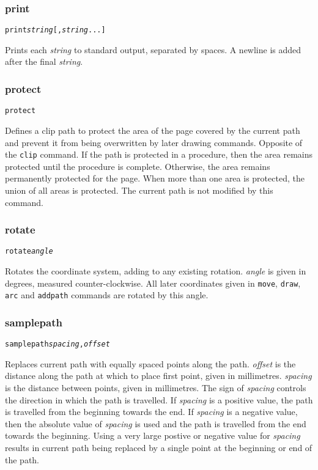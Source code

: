 \subsubsection{print}

\begin{alltt}
print \textit{string} [, \textit{string} ...]
\end{alltt}

Prints each \textit{string} to standard output,
separated by spaces.
A newline is added after the final \textit{string}.

\subsubsection{protect}

\begin{alltt}
protect
\end{alltt}

Defines a clip path to protect the area of the page covered by the current path
and prevent it from being overwritten by later drawing commands.  Opposite of
the \texttt{clip} command.  If the path is protected in a procedure, then the
area remains protected until the procedure is complete.  Otherwise, the area
remains permanently protected for the page.  When more than one area is
protected, the union of all areas is protected.  The current path is not
modified by this command.

\subsubsection{rotate}

\begin{alltt}
rotate \textit{angle}
\end{alltt}

Rotates the coordinate system, adding to any existing rotation.  \textit{angle}
is given in degrees, measured counter-clockwise.  All later coordinates given
in \texttt{move}, \texttt{draw}, \texttt{arc} and \texttt{addpath} commands are
rotated by this angle.

\subsubsection{samplepath}

\begin{alltt}
samplepath \textit{spacing}, \textit{offset}
\end{alltt}

Replaces current path with equally spaced points along the path.
\textit{offset} is the distance along the path at which to place first point,
given in millimetres.  \textit{spacing} is the distance between points, given
in millimetres.  The sign of \textit{spacing} controls the direction in which
the path is travelled.  If \textit{spacing} is a positive value, the path is
travelled from the beginning towards the end.  If \textit{spacing} is a
negative value, then the absolute value of \textit{spacing} is used and the
path is travelled from the end towards the beginning.  Using a very large
postive or negative value for \textit{spacing} results in current path being
replaced by a single point at the beginning or end of the path.

